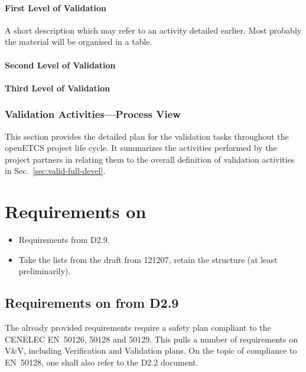 \documentclass{template/openetcs_report}
\begin{document}
\subsubsection{First Level of Validation}
\label{sec:first-level-valid}

A short description which may refer to an activity
  detailed earlier. Most probably the material will be organised in a table.

\subsubsection{Second Level of Validation}
\label{sec:secon-level-valid}

\subsubsection{Third Level of Validation}
\label{sec:third-level-valid}


\subsection{Validation Activities---Process View}
\label{sec:valid-activ-proce}
This section provides the detailed plan for the validation tasks
throughout the openETCS project life cycle. It summarizes the
activities performed by the project partners in relating them to the
overall definition of validation activities in
Sec.~\ref{sec:valid-full-devel}. 


\appendix
\chapter{Requirements on \VV}
\label{sec:appendix}

{\it
  \begin{itemize}
  \item Requirements from D2.9.
  \item Take the lists from the draft from 121207, retain the structure (at
    least preliminarily). 
  \end{itemize}
}

\section{Requirements on \VV from D2.9}
\label{sec:requirements-vv-D29}

The already provided requirements require a
safety plan compliant to the CENELEC EN~50126, 50128 and 50129.  This
pulls a number of requirements on V\&V, including Verification and
Validation plans. On the topic of compliance to EN~50128, one shall
also refer to the D2.2 document.
\end{document}
